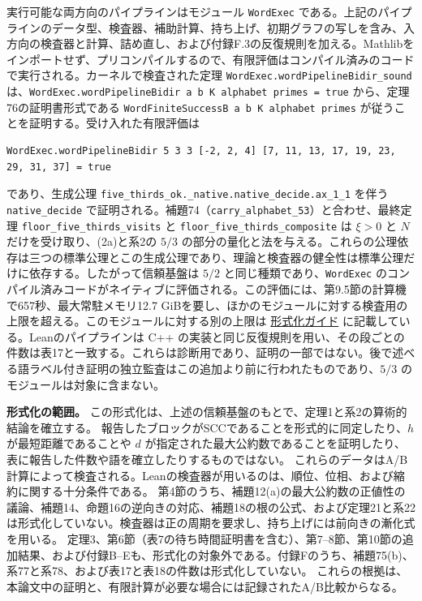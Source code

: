 \documentclass[11pt,reqno]{amsart}
\theoremstyle{definition}
\theoremstyle{definition}
\theoremstyle{remark}
\begin{document}
実行可能な両方向のパイプラインはモジュール \nolinkurl{WordExec} である。上記のパイプラインのデータ型、検査器、補助計算、持ち上げ、初期グラフの写しを含み、入方向の検査器と計算、詰め直し、および付録F.3の反復規則を加える。Mathlibをインポートせず、プリコンパイルするので、有限評価はコンパイル済みのコードで実行される。カーネルで検査された定理 \nolinkurl{WordExec.wordPipelineBidir_sound} は、\texttt{WordExec.wordPipelineBidir\ a\ b\ K\ alphabet\ primes\ =\ true} から、定理76の証明書形式である \texttt{WordFiniteSuccessB\ a\ b\ K\ alphabet\ primes} が従うことを証明する。受け入れた有限評価は
\begin{Verbatim}[fontsize=\small,breaklines=true,breakanywhere=true]
WordExec.wordPipelineBidir 5 3 3 [-2, 2, 4] [7, 11, 13, 17, 19, 23, 29, 31, 37] = true
\end{Verbatim}
であり、生成公理 \nolinkurl{five_thirds_ok._native.native_decide.ax_1_1} を伴う \nolinkurl{native_decide} で証明される。補題74（\nolinkurl{carry_alphabet_53}）と合わせ、最終定理 \nolinkurl{floor_five_thirds_visits} と \nolinkurl{floor_five_thirds_composite} は \(\xi>0\) と \(N\) だけを受け取り、(2a)と系2の \(5/3\) の部分の量化と法を与える。これらの公理依存は三つの標準公理とこの生成公理であり、理論と検査器の健全性は標準公理だけに依存する。したがって信頼基盤は \(5/2\) と同じ種類であり、\nolinkurl{WordExec} のコンパイル済みコードがネイティブに評価される。この評価には、第9.5節の計算機で657秒、最大常駐メモリ12.7 GiBを要し、ほかのモジュールに対する検査用の上限を超える。このモジュールに対する別の上限は \href{supplement/FORMALIZATION.md}{形式化ガイド} に記載している。Leanのパイプラインは C++ の実装と同じ反復規則を用い、その段ごとの件数は表17と一致する。これらは診断用であり、証明の一部ではない。後で述べる語ラベル付き証明の独立監査はこの追加より前に行われたものであり、\(5/3\) のモジュールは対象に含まない。

\textbf{形式化の範囲。} この形式化は、上述の信頼基盤のもとで、定理1と系2の算術的結論を確立する。
報告したブロックがSCCであることを形式的に同定したり、\(h\) が最短距離であることや \(d\) が指定された最大公約数であることを証明したり、表に報告した件数や語を確立したりするものではない。
これらのデータはA/B計算によって検査される。Leanの検査器が用いるのは、順位、位相、および縮約に関する十分条件である。
第4節のうち、補題12(a)の最大公約数の正値性の議論、補題14、命題16の逆向きの対応、補題18の根の公式、および定理21と系22は形式化していない。検査器は正の周期を要求し、持ち上げには前向きの漸化式を用いる。
定理3、第6節（表7の待ち時間証明書を含む）、第7--8節、第10節の追加結果、および付録B--Eも、形式化の対象外である。付録Fのうち、補題75(b)、系77と系78、および表17と表18の件数は形式化していない。
これらの根拠は、本論文中の証明と、有限計算が必要な場合には記録されたA/B比較からなる。
\end{document}
